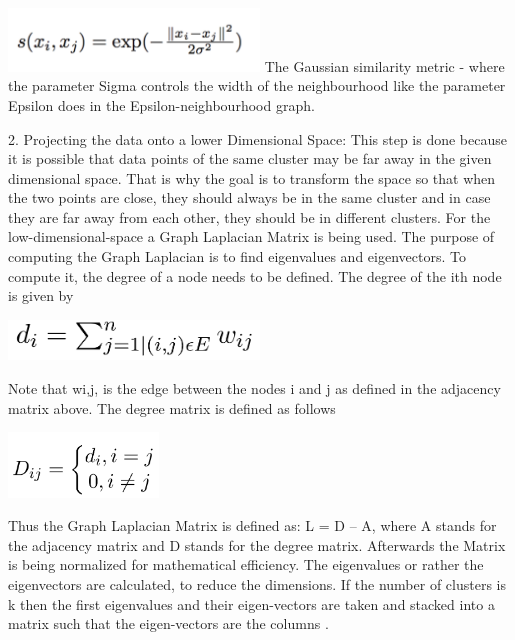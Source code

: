 \includegraphics[width=0.5\textwidth]{images/spectral_gaussian.PNG} \newline
 The Gaussian similarity metric - where the parameter Sigma controls the width of the neighbourhood like the parameter Epsilon does in the Epsilon-neighbourhood graph. \newline

2.	Projecting the data onto a lower Dimensional Space: This step is done because it is possible that data points of the same cluster may be far away in the given dimensional space. That is why the goal is to transform the space so that when the two points are close, they should always be in the same cluster and in case they are far away from each other, they should be in different clusters. For the low-dimensional-space a Graph Laplacian Matrix is being used. The purpose of computing the Graph Laplacian is to find eigenvalues and eigenvectors. To compute it, the degree of a node needs to be defined. The degree of the ith node is given by \newline

\includegraphics[width=0.5\textwidth]{images/spectral_degree.png}

Note that wi,j, is the edge between the nodes i and j as defined in the adjacency matrix above. The degree matrix is defined as follows \newline

\includegraphics[width=0.3\textwidth]{images/spectral_degree_matrix.png}

Thus the Graph Laplacian Matrix is defined as: L = D – A, where A stands for the adjacency matrix and D stands for the degree matrix.
Afterwards the Matrix is being normalized for mathematical efficiency. The eigenvalues or rather the eigenvectors are calculated, to reduce the dimensions. If the number of clusters is k then the first eigenvalues and their eigen-vectors are taken and stacked into a matrix such that the eigen-vectors are the columns \cite{spectral-website}. \newline

